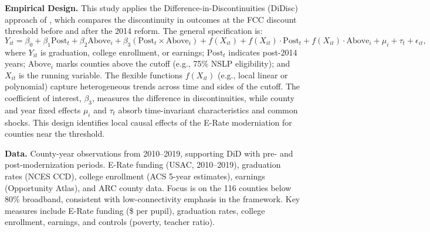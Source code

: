 \textbf{Empirical Design.} This study applies the Difference-in-Discontinuities (DiDisc) approach of \citet{grembiFiscalRulesMatter2016}, which compares the discontinuity in outcomes at the FCC discount threshold before and after the 2014 reform. The general specification is:
\[
Y_{it} = \beta_0 + \beta_1 \text{Post}_t + \beta_2 \text{Above}_i + \beta_3 (\text{Post}_t \times \text{Above}_i) 
+ f(X_{it}) + f(X_{it}) \cdot \text{Post}_t + f(X_{it}) \cdot \text{Above}_i 
+ \mu_i + \tau_t + \epsilon_{it},
\]
where $Y_{it}$ is graduation, college enrollment, or earnings; $\text{Post}_t$ indicates post-2014 years; $\text{Above}_i$ marks counties above the cutoff (e.g., 75\% NSLP eligibility); and $X_{it}$ is the running variable. The flexible functions $f(X_{it})$ (e.g., local linear or polynomial) capture heterogeneous trends across time and sides of the cutoff. The coefficient of interest, $\beta_3$, measures the difference in discontinuities, while county and year fixed effects $\mu_i$ and $\tau_t$ absorb time-invariant characteristics and common shocks. This design identifies local causal effects of the E-Rate moderniation for counties near the threshold.


\textbf{Data.} County-year observations from 2010–2019, supporting DiD with pre- and post-modernization periods. E-Rate funding (USAC, 2010–2019), graduation rates (NCES CCD), college enrollment (ACS 5-year estimates), earnings (Opportunity Atlas), and ARC county data. Focus is on the 116 counties below 80\% broadband, consistent with low-connectivity emphasis in the framework. Key measures include E-Rate funding (\$ per pupil), graduation rates, college enrollment, earnings, and controls (poverty, teacher ratio).







